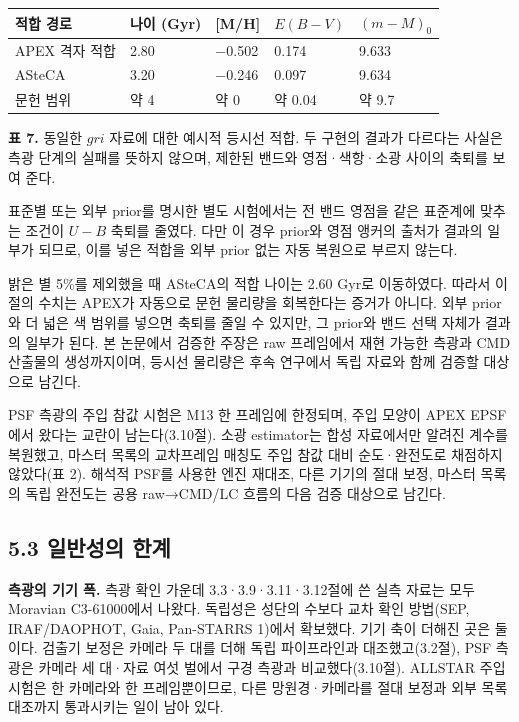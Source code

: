 \begin{table}[!t]
\centering\small
\begin{tabularx}{\textwidth}{XXXXX}
\toprule
적합 경로 & 나이 (Gyr) & [M/H] & $E(B-V)$ & $(m-M)_0$ \\
\midrule
APEX 격자 적합 & 2.80 & −0.502 & 0.174 & 9.633 \\
ASteCA & 3.20 & −0.246 & 0.097 & 9.634 \\
문헌 범위 & 약 4 & 약 0 & 약 0.04 & 약 9.7 \\
\bottomrule
\end{tabularx}
\end{table}

\textbf{표 7.} 동일한 $gri$ 자료에 대한 예시적 등시선 적합. 두 구현의 결과가 다르다는 사실은 측광 단계의 실패를 뜻하지 않으며, 제한된 밴드와 영점·색항·소광 사이의 축퇴를 보여 준다.



표준별 또는 외부 prior를 명시한 별도 시험에서는 전 밴드 영점을 같은 표준계에 맞추는 조건이 $U-B$ 축퇴를 줄였다. 다만 이 경우 prior와 영점 앵커의 출처가 결과의 일부가 되므로, 이를 넣은 적합을 외부 prior 없는 자동 복원으로 부르지 않는다.



밝은 별 5\%를 제외했을 때 ASteCA의 적합 나이는 2.60 Gyr로 이동하였다. 따라서 이 절의 수치는 APEX가 자동으로 문헌 물리량을 회복한다는 증거가 아니다. 외부 prior와 더 넓은 색 범위를 넣으면 축퇴를 줄일 수 있지만, 그 prior와 밴드 선택 자체가 결과의 일부가 된다. 본 논문에서 검증한 주장은 raw 프레임에서 재현 가능한 측광과 CMD 산출물의 생성까지이며, 등시선 물리량은 후속 연구에서 독립 자료와 함께 검증할 대상으로 남긴다.



PSF 측광의 주입 참값 시험은 M13 한 프레임에 한정되며, 주입 모양이 APEX EPSF에서 왔다는 교란이 남는다(3.10절). 소광 estimator는 합성 자료에서만 알려진 계수를 복원했고, 마스터 목록의 교차프레임 매칭도 주입 참값 대비 순도·완전도로 채점하지 않았다(표 2). 해석적 PSF를 사용한 엔진 재대조, 다른 기기의 절대 보정, 마스터 목록의 독립 완전도는 공용 raw→CMD/LC 흐름의 다음 검증 대상으로 남긴다.



\subsection{5.3 일반성의 한계}

\textbf{측광의 기기 폭.} 측광 확인 가운데 3.3·3.9·3.11·3.12절에 쓴 실측 자료는 모두 Moravian C3-61000에서 나왔다. 독립성은 성단의 수보다 교차 확인 방법(SEP, IRAF/DAOPHOT, Gaia, Pan-STARRS 1)에서 확보했다. 기기 축이 더해진 곳은 둘이다. 검출기 보정은 카메라 두 대를 더해 독립 파이프라인과 대조했고(3.2절), PSF 측광은 카메라 세 대·자료 여섯 벌에서 구경 측광과 비교했다(3.10절). ALLSTAR 주입 시험은 한 카메라와 한 프레임뿐이므로, 다른 망원경·카메라를 절대 보정과 외부 목록 대조까지 통과시키는 일이 남아 있다.



